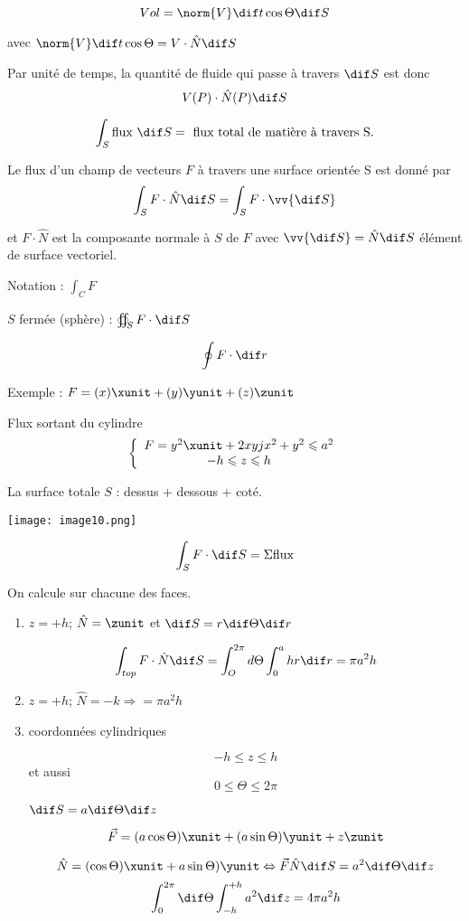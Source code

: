  \[Vol = \norm{V}\dif t \cos \Theta \dif S\]

 avec $\norm{V}\dif t \cos \Theta = V\cdot \hat N \dif S$


 Par unité de temps, la quantité de fluide qui passe à travers $\dif S$ est donc \[V(P) \cdot \hat N(P) \dif S\]

 \[\int_S \text{flux } \dif S = \text{ flux total de matière à travers S.}\]

 \begin{mydef}
 Le flux d'un champ de vecteurs $F$ à travers une surface orientée S est donné par\[\int_S F \cdot \hat N \dif S = \int_S F \cdot \vv{\dif S}\]

 et $F \cdot \hat N$ est la composante normale à $S$ de $F$ avec $\vv{\dif S} = \hat N \dif S$ élément de surface vectoriel.

 Notation : $\int_C F$
 \end{mydef}

\begin{myrem}

$S$ fermée (sphère) :  $ \oiint_S F\cdot \dif S$

\[\oint F\cdot \dif r\]

\end{myrem}

Exemple : $F = (x) \xunit + (y) \yunit+(z) \zunit$

Flux sortant du cylindre
\[\left\{
\begin{array}{c}
F=y^2\xunit+2xyjx^2+y^2\leqslant a^2 \\ %
-h\leqslant z \leqslant h
\end{array}
\right.\]


La surface totale $S$ : dessus + dessous + coté.

\texttt{[image: image10.png]}

\[\int_S F\cdot \dif S = \Sigma\text{flux}\]

On calcule sur chacune des faces.

\begin{enumerate}
  \item
    $z = +h$; $\hat N = \zunit$ et  $\dif S= r\dif\Theta \dif r$

    \[\int_{top}F\cdot \hat N \dif S = \int_O^{2\pi} d\Theta \int_0^a h r \dif r = \pi a^2 h\]

  \item $z = +h$; $\hat N = -k \Rightarrow =\pi a^2 h $

  \item coordonnées cylindriques

    \[-h \leq z\leq h \] et aussi
    \[0\leq \Theta \leq 2 \pi\]

    $\dif S = a\dif \Theta \dif z$

    \[\vec{F} = (a\cos\Theta ) \xunit +(a\sin\Theta ) \yunit + z \zunit  \]

    \[\hat N = (\cos\Theta ) \xunit +a\sin\Theta ) \yunit\Leftrightarrow \vec F \hat N \dif S = a^2\dif \Theta \dif z\]
    \[\int_0^{2\pi} \dif \Theta \int_{-h}^{+h} a^2 \dif z = 4\pi a^2 h\]

\end{enumerate}

